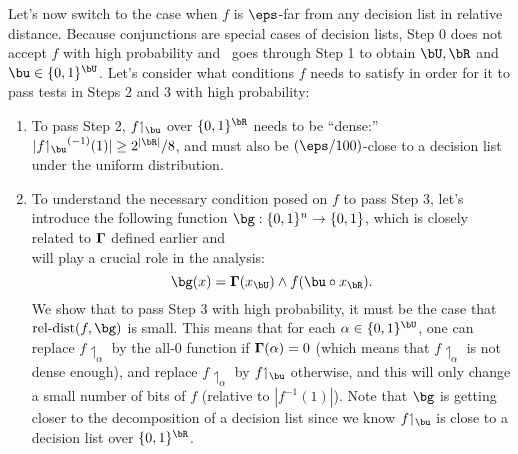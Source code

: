\documentclass[11pt]{article}
\theoremstyle{definition}
\begin{document}
\medskip
{}
Let's now switch to the case when $f$ is $\eps$-far from
  any decision list in relative distance.
Because conjunctions are special cases of decision lists,
  Step 0 does not accept $f$ with high probability and 
  ~goes through Step 1 to obtain $\bU,\bR$ and $\bu\in \{0,1\}^{\bU}$.
Let's consider what conditions $f$ needs to satisfy 
  in order for it to pass tests in Steps 2 and 3 with high probability:
\begin{flushleft}
\begin{enumerate}
\item To pass Step 2,   $f{\upharpoonleft_{\bu}}$  over $\{0,1\}^{\bR}$ needs to be ``dense:'' $|f{\upharpoonleft_{\bu}}^{(-1)}(1)|\ge 2^{|\bR|}/8$, and 
  must also be $(\eps/100)$-close to a decision list under the uniform distribution.
\item To understand the necessary condition posed on $f$ to 
  pass Step 3, let's introduce the following function $\bg:\{0,1\}^n\rightarrow \{0,1\}$, which is closely related to $\mathbf{\Gamma}$ defined earlier and\\ will play a crucial role in the analysis:
$$
\bg(x)= \bGamma(x_{\bU}) \wedge f(\bu\circ x_{\bR}). 
$$
We show that to pass Step 3 with high probability,
  it must be the case that
  $\reldist(f,\bg)$ is small.
This means that for each $\alpha\in \{0,1\}^{\bU}$, one can replace $f{\upharpoonleft_{\alpha}}$ by the 
  all-$0$ function if $\mathbf{\Gamma}(\alpha)=0$ (which means that $f{\upharpoonleft_{\alpha}}$ is not dense enough),
  and replace $f{\upharpoonleft_{\alpha}}$ by 
  $f{\upharpoonleft_{\bu}}$ otherwise, and this will only change a small number of bits of $f$ (relative to $|f^{-1}(1)|$). 
  Note that $\bg$ is getting closer to the decomposition of a decision list 
  since we know $f{\upharpoonleft_{\bu}}$ is close to a decision list over $\{0,1\}^{\bR}$.
\end{enumerate}
\end{flushleft}
\end{document}
